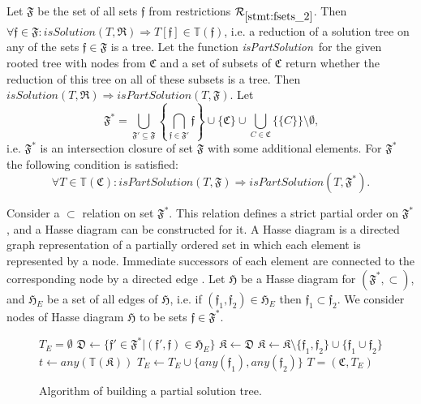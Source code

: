 \documentclass[times, 10pt,twocolumn]{article}
\newcommand{\gC}{\mathfrak{C}}
\newcommand{\gD}{\mathfrak{D}}
\newcommand{\gF}{\mathfrak{F}}
\newcommand{\gH}{\mathfrak{H}}
\newcommand{\gK}{\mathfrak{K}}
\newcommand{\gR}{\mathfrak{R}}
\newcommand{\gf}{\mathfrak{f}}
\newcommand{\cR}{\mathcal{R}}
\newcommand{\nT}{\mathbb{T}}
\newcommand{\gFs}{\gF^*}
\newcommand{\any}{\textit{any}}
\newcommand{\isSol}{\textit{isSolution}}
\newcommand{\isPartSol}{\textit{isPartSolution}}
\begin{document}
Let $\gF$ be the set of all sets $\gf$ from
restrictions $\cR_{\ref{stmt:fsets_2}}$.
Then $\forall \gf \in \gF: \isSol(T, \gR) \Longrightarrow T[\gf] \in \nT(\gf)$,
i.e. a reduction of a solution tree on any of the sets $\gf \in \gF$ is a tree.
Let the function \isPartSol~for the given rooted tree with nodes from $\gC$
and a set of subsets of $\gC$ return whether the reduction of this tree
on all of these subsets is a tree. 
Then $\isSol(T, \gR) \Longrightarrow \isPartSol(T, \gF)$. Let
\begin{equation}\label{eq:f_star_def}
\gFs = \bigcup_{\gF' \subseteq \gF} \left\{ \bigcap_{\gf \in \gF'} \gf \right\} \cup \{\gC\} \cup \bigcup_{C \in \gC}\{\{C\}\} \setminus \emptyset \text{,}
\end{equation}
i.e. $\gFs$ is an intersection closure of set $\gF$
with some additional elements.
For $\gFs$ the following condition is satisfied:
\begin{equation}\label{lemma:f_closure_tree}
\forall T \in \nT(\gC): \isPartSol(T, \gF) \Longrightarrow \isPartSol(T, \gFs) \text{.}
\end{equation}

Consider a $\subset$ relation on set $\gFs$.
This relation defines a strict partial order on $\gFs$,
and a Hasse diagram can be constructed for it.
A Hasse diagram is a directed graph representation of
a partially ordered set in which each element is represented by a node.
Immediate successors of each element are connected
to the corresponding node by a directed edge \cite{lerma04}.
Let $\gH$ be a Hasse diagram for $(\gFs, \subset)$,
and $\gH_E$ be a set of all edges of $\gH$,
i.e. if $(\gf_1, \gf_2) \in \gH_E$ then $\gf_1 \subset \gf_2$.
We consider nodes of Hasse diagram $\gH$ to be sets $\gf \in \gFs$.

\begin{figure}[htb!]
\begin{algorithmic}[1]
\STATE $T_E = \emptyset$
\FORALL{$\gf \in \gFs$}
    \STATE $\gD \gets \{\gf' \in \gFs | (\gf', \gf) \in \gH_E\}$
    \STATE $\gK \gets \gD$
    \WHILE{$\exists \gf_1, \gf_2 \in \gK: \gf_1 \cap \gf_2 \ne \emptyset$}
        \STATE $\gK \gets \gK \setminus \{\gf_1, \gf_2\} \cup \{\gf_1 \cup \gf_2\}$
    \ENDWHILE
    \STATE $t \gets \any(\nT(\gK))$
    \FORALL{$\{\gf_1, \gf_2\} \in t_E$}
        \STATE $T_E \gets T_E \cup \{\any(\gf_1), \any(\gf_2)\}$
    \ENDFOR
\ENDFOR
\RETURN $T = (\gC, T_E)$
\end{algorithmic}
\caption{Algorithm of building a partial solution tree.}
\label{alg:build_tree}
\end{figure}
\fi
\end{document}
